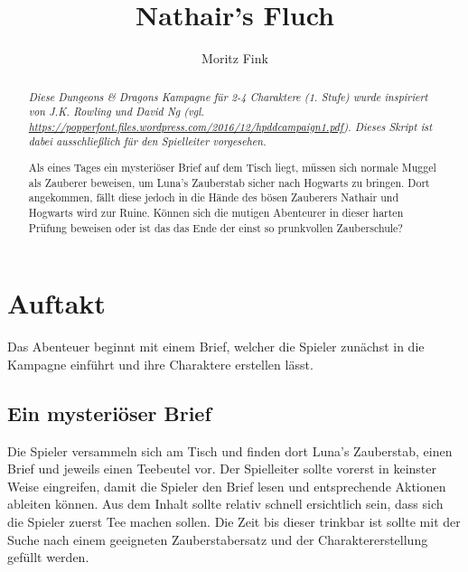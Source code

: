 \documentclass[]{scrartcl}
\title{Nathair's Fluch}
\author{Moritz Fink}
\begin{document}
\maketitle

\begin{abstract}
\textit{
Diese Dungeons \& Dragons Kampagne für 2-4 Charaktere (1. Stufe) wurde inspiriert von J.K. Rowling und David Ng (vgl. \url{https://popperfont.files.wordpress.com/2016/12/hpddcampaign1.pdf}). Dieses Skript ist dabei ausschließlich für den Spielleiter vorgesehen.\\
}

Als eines Tages ein mysteriöser Brief auf dem Tisch liegt, müssen sich normale Muggel als Zauberer beweisen, um Luna's Zauberstab sicher nach Hogwarts zu bringen. Dort angekommen, fällt diese jedoch in die Hände des bösen Zauberers Nathair und Hogwarts wird zur Ruine. Können sich die mutigen Abenteurer in dieser harten Prüfung beweisen oder ist das das Ende der einst so prunkvollen Zauberschule?
\end{abstract}

\newpage

\tableofcontents

\newpage

\section{Auftakt}

Das Abenteuer beginnt mit einem Brief, welcher die Spieler zunächst in die Kampagne einführt und ihre Charaktere erstellen lässt.

\subsection{Ein mysteriöser Brief}

Die Spieler versammeln sich am Tisch und finden dort Luna's Zauberstab, einen Brief und jeweils einen Teebeutel vor. Der Spielleiter sollte vorerst in keinster Weise eingreifen, damit die Spieler den Brief lesen und entsprechende Aktionen ableiten können. Aus dem Inhalt sollte relativ schnell ersichtlich sein, dass sich die Spieler zuerst Tee machen sollen. Die Zeit bis dieser trinkbar ist sollte mit der Suche nach einem geeigneten Zauberstabersatz und der Charaktererstellung gefüllt werden.

\newpage
\end{document}
